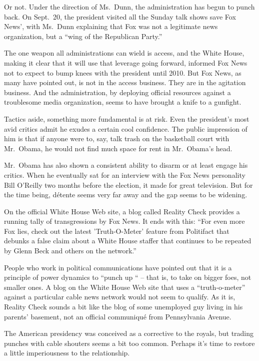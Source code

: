 ﻿\documentclass[12pt]{article}
\begin{document}
Or not. Under the direction of Ms.~Dunn, the administration has begun to punch back. On Sept.~20,
the president visited all the Sunday talk shows save Fox News', with Ms.~Dunn explaining that Fox
was not a legitimate news organization, but a ``wing of the Republican Party.''

The one weapon all administrations can wield is access, and the White House, making it clear that it
will use that leverage going forward, informed Fox News not to expect to bump knees with the
president until 2010. But Fox News, as many have pointed out, is not in the access business. They
are in the agitation business. And the administration, by deploying official resources against a
troublesome media organization, seems to have brought a knife to a gunfight.

Tactics aside, something more fundamental is at risk. Even the president's most avid critics admit
he exudes a certain cool confidence. The public impression of him is that if anyone were to, say,
talk trash on the basketball court with Mr.~Obama, he would not find much space for rent in
Mr.~Obama's head.

Mr.~Obama has also shown a consistent ability to disarm or at least engage his critics. When he
eventually sat for an interview with the Fox News personality Bill O'Reilly two months before the
election, it made for great television. But for the time being, d\'etente seems very far away and
the gap seems to be widening.

On the official White House Web site, a blog called Reality Check provides a running tally of
transgressions by Fox News. It ends with this: ``For even more Fox lies, check out the latest
'Truth-O-Meter' feature from Politifact that debunks a false claim about a White House staffer that
continues to be repeated by Glenn Beck and others on the network.''

People who work in political communications have pointed out that it is a principle of power
dynamics to ``punch up `` -- that is, to take on bigger foes, not smaller ones. A blog on the White
House Web site that uses a ``truth-o-meter'' against a particular cable news network would not seem
to qualify. As it is, Reality Check sounds a bit like the blog of some unemployed guy living in his
parents' basement, not an official communiqu\'e from Pennsylvania Avenue.

The American presidency was conceived as a corrective to the royals, but trading punches with cable
shouters seems a bit too common. Perhaps it's time to restore a little imperiousness to the
relationship.
\end{document}
